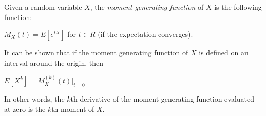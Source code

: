 \documentclass[12pt]{article}
\begin{document}

Given a random variable $X$, the \emph{moment generating function} of $X$ is the following function:\\
\par
$M_X(t) = E[e^{tX}]$ for $t \in R$ (if the expectation converges).
\par
\par
It can be shown that if the moment generating function of $X$ is defined on an interval around the origin, then\\
\par
$E[X^k] = M_X^{(k)}(t) |_{t=0} $\\
\par
In other words, the $k$th-derivative of the moment generating function evaluated at zero is the $k$th moment of $X$.
\end{document}
